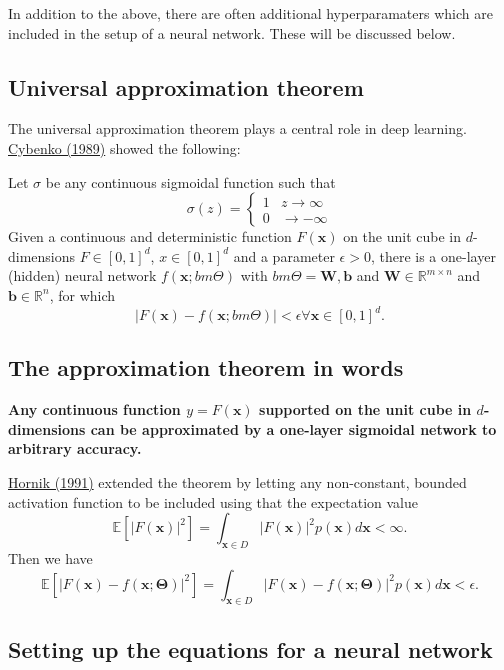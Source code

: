 \documentclass[%
oneside,                 %
final,                   %
10pt]{article}
\begin{document}
In addition to the above, there are often additional hyperparamaters
which are included in the setup of a neural network. These will be
discussed below.

\subsection{Universal approximation theorem}

The universal approximation theorem plays a central role in deep
learning.  \href{{https://link.springer.com/article/10.1007/BF02551274}}{Cybenko (1989)} showed
the following:

\begin{block}{}
Let $\sigma$ be any continuous sigmoidal function such that
\[
\sigma(z) = \left\{\begin{array}{cc} 1 & z\rightarrow \infty\\ 0 & \rightarrow -\infty \end{array}\right.
\]
Given a continuous and deterministic function $F(\bm{x})$ on the unit
cube in $d$-dimensions $F\in [0,1]^d$, $x\in [0,1]^d$ and a parameter
$\epsilon >0$, there is a one-layer (hidden) neural network
$f(\bm{x};bm{\Theta})$ with $bm{\Theta}=\bm{W},\bm{b}$ and $\bm{W}\in
\mathbb{R}^{m\times n}$ and $\bm{b}\in \mathbb{R}^{n}$, for which
\[
\vert F(\bm{x})-f(\bm{x};bm{\Theta})\vert < \epsilon \forall \bm{x}\in[0,1]^d.
\]

\end{block}

\subsection{The approximation theorem in words}

\textbf{Any continuous function $y=F(\bm{x})$ supported on the unit cube in
$d$-dimensions can be approximated by a one-layer sigmoidal network to
arbitrary accuracy.}

\href{{https://www.sciencedirect.com/science/article/abs/pii/089360809190009T}}{Hornik (1991)} extended the theorem by letting any non-constant, bounded activation function to be included using that the expectation value
\[
\mathbb{E}[\vert F(\bm{x})\vert^2] =\int_{\bm{x}\in D} \vert F(\bm{x})\vert^2p(\bm{x})d\bm{x} < \infty.
\]
Then we have
\[
\mathbb{E}[\vert F(\bm{x})-f(\bm{x};\bm{\Theta})\vert^2] =\int_{\bm{x}\in D} \vert F(\bm{x})-f(\bm{x};\bm{\Theta})\vert^2p(\bm{x})d\bm{x} < \epsilon.
\]

\subsection{Setting up the equations for a neural network}
\end{document}
